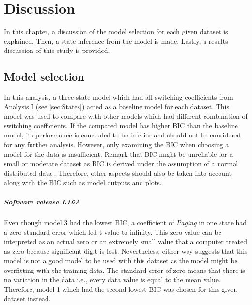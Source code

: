 
\lhead[\chaptername~\thechapter]{\rightmark}

\rhead[\leftmark]{}

\lfoot[\thepage]{}

\cfoot{}

\rfoot[]{\thepage}

\chapter{Discussion\label{chap:Discussion}}

In this chapter, a discussion of the model selection for each given
dataset is explained. Then, a state inference from the model is made.
Lastly, a results discussion of this study is provided.

\section{Model selection \label{subsec:Model-selection}}

In this analysis, a three-state model which had all switching coefficients
from Analysis I (see \ref{sec:States}) acted as a baseline model
for each dataset. This model was used to compare with other models
which had different combination of switching coefficients. If the
compared model has higher BIC than the baseline model, its performance
is concluded to be inferior and should not be considered for any further
analysis. However, only examining the BIC when choosing a model for
the data is insufficient. Remark that BIC might be unreliable for
a small or moderate dataset as BIC is derived under the assumption
of a normal distributed data \citep{ryden2008versus}. Therefore,
other aspects should also be taken into account along with the BIC
such as model outputs and plots. 

\paragraph*{Software release L16A}

Even though model 3 had the lowest BIC, a coefficient of \emph{Paging}
in one state had a zero standard error which led t-value to infinity.
This zero value can be interpreted as an actual zero or an extremely
small value that a computer treated as zero because significant digit
is lost. Nevertheless, either way suggests that this model is not
a good model to be used with this dataset as the model might be overfitting
with the training data. The standard error of zero means that there
is no variation in the data i.e., every data value is equal to the
mean value. Therefore, model 1 which had the second lowest BIC was
chosen for this given dataset instead. %
\begin{comment}
The t statistic is the coefficient divided by its standard error.
The standard error is an estimate of the standard deviation of the
coefficient, the amount it varies across cases. It can be thought
of as a measure of the precision with which the regression coefficient
is measured. If a coefficient is large compared to its standard error,
then it is probably different from 0.
\end{comment}



